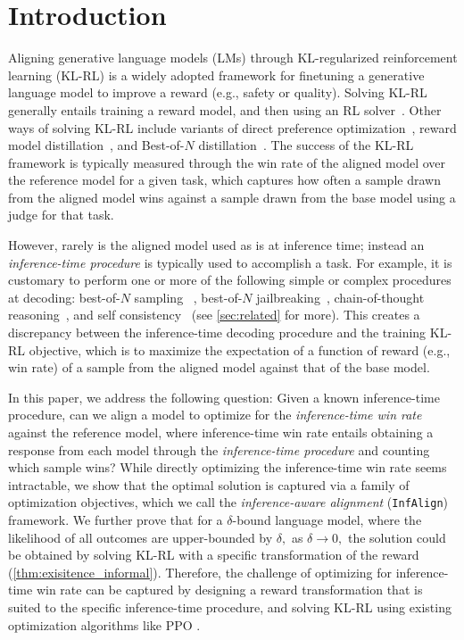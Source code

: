 \documentclass{article}
\newcommand{\iapo}{\texttt{InfAlign}\xspace}
\begin{document}
\section{Introduction} \label{sec:intro}
Aligning generative language models (LMs) through KL-regularized reinforcement learning (KL-RL) is a widely adopted framework for finetuning a generative language model to improve a reward (e.g., safety or quality). Solving KL-RL generally entails training a reward model, and then using an RL solver~\citep{christiano2017deep, stiennon2020learning, ouyang2022training}. Other ways of solving KL-RL include variants of direct preference optimization~\citep{rafailov2024direct, azar2023general}, reward model distillation~\citep{fisch2024robust}, and Best-of-$N$ distillation~\citep{yang2024asymptotics, gui2024bonbonalignmentlargelanguage, amini2024variationalbestofnalignment, sessa2024bondaligningllmsbestofn}.
The success of the KL-RL framework is typically measured through the win rate of the aligned model over the reference model for a given task, which captures how often a sample drawn from the aligned model wins against a sample drawn from the base model using a judge for that task. 

However, rarely is the aligned model used as is at inference time; instead an {\em inference-time procedure} is typically used to accomplish a task. For example, it is customary to perform one or more of the following simple or complex procedures at decoding: best-of-$N$ sampling ~\citep{nakano2022webgptbrowserassistedquestionansweringhuman, beirami2024theoretical}, best-of-$N$  jailbreaking~\citep{hughes2024bestofnjailbreaking}, chain-of-thought reasoning~\citep{wei2022chain, o1}, and self consistency~\citep{self-consistency} (see \cref{sec:related} for more).
%
This creates a discrepancy between the inference-time decoding procedure and the training KL-RL objective, %
%
which is to maximize the expectation of a function of reward (e.g., win rate) of a sample from the aligned model against that of the base model.

%

In this paper, we address the following question: Given a known inference-time procedure, can we align a model to optimize for the {\em inference-time win rate} against the reference model, where inference-time win rate entails obtaining a response from each model through the \emph{inference-time procedure} and counting which sample wins? %
While directly optimizing the inference-time win rate seems intractable,
%
we show that the optimal solution is captured via a family of optimization objectives, which we call the {\em inference-aware alignment} (\iapo) framework. 
%
We further prove that for a $\delta$-bound language model, where the likelihood of all outcomes are upper-bounded by $\delta,$ as $\delta \to 0,$ the solution could be obtained by solving KL-RL with a specific transformation of the reward (\cref{thm:exisitence_informal}). Therefore, the challenge of optimizing for inference-time win rate can be captured by designing a reward transformation that is suited to the specific inference-time procedure, and solving KL-RL using existing optimization algorithms like PPO \citep{schulman2017proximal}.
\end{document}
